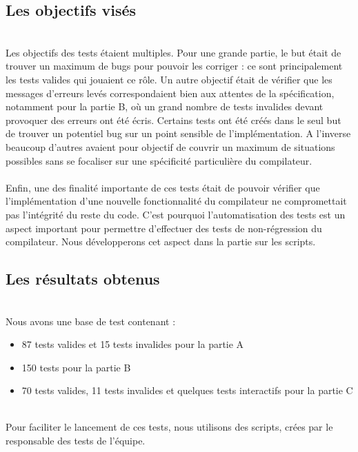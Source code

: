 \documentclass{article}
\begin{document}
\subsection{Les objectifs visés}
\\
Les objectifs des tests étaient multiples. Pour une grande partie, le but était de trouver un maximum de bugs pour pouvoir les corriger : ce sont principalement les tests valides qui jouaient ce rôle.
Un autre objectif était de vérifier que les messages d'erreurs levés correspondaient bien aux attentes de la spécification, notamment pour la partie B, où un grand nombre de tests invalides devant
provoquer des erreurs ont été écris. \newline
Certains tests ont été créés dans le seul but de trouver un potentiel bug sur un point sensible de l'implémentation. A l'inverse beaucoup d'autres avaient pour objectif de couvrir un maximum de situations possibles
sans se focaliser sur une spécificité particulière du compilateur.
\\\\
Enfin, une des finalité importante de ces tests était de pouvoir vérifier que l'implémentation d'une nouvelle fonctionnalité du compilateur ne compromettait pas l'intégrité du reste du code.
C'est pourquoi l'automatisation des tests est un aspect important pour permettre d'effectuer des tests de non-régression du compilateur. Nous développerons cet aspect dans la partie sur les scripts.


\subsection{Les résultats obtenus}
\\
Nous avons une base de test contenant :
\\
\begin{itemize}
\item 87 tests valides et 15 tests invalides pour la partie A
\item 150 tests pour la partie B
\item 70 tests valides, 11 tests invalides et quelques tests interactifs pour la partie C
\end{itemize}
\\
Pour faciliter le lancement de ces tests, nous utilisons des scripts, crées par le responsable des tests de l'équipe.
\end{document}
